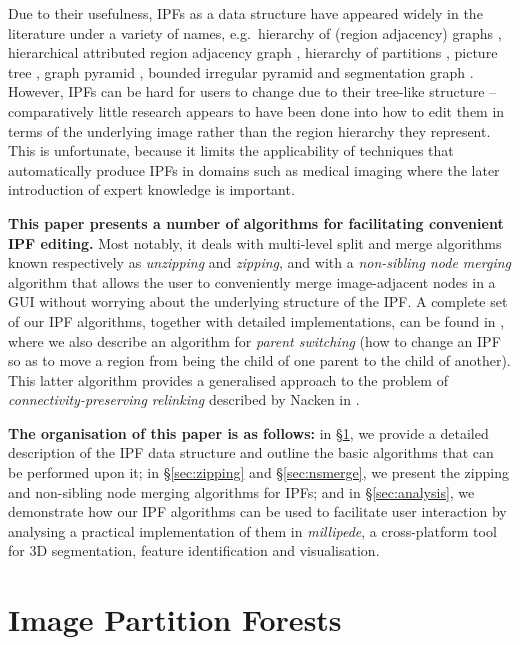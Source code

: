 \documentclass[10pt,twocolumn,twoside]{IEEEtran}
\begin{document}
\IEEEpubidadjcol

Due to their usefulness, IPFs as a data structure have appeared widely in the literature under a variety of names, e.g.~hierarchy of (region adjacency) graphs \cite{kropatsch04,nacken95,shen97}, hierarchical attributed region adjacency graph \cite{fischer04}, hierarchy of partitions \cite{haxhimusa03,lezoray06}, picture tree \cite{andrade03}, graph pyramid \cite{kerren06}, bounded irregular pyramid \cite{marfil07} and segmentation graph \cite{borenstein06}. However, IPFs can be hard for users to change due to their tree-like structure -- comparatively little research appears to have been done into how to edit them in terms of the underlying image rather than the region hierarchy they represent. This is unfortunate, because it limits the applicability of techniques that automatically produce IPFs in domains such as medical imaging where the later introduction of expert knowledge is important.

\textbf{This paper presents a number of algorithms for facilitating convenient IPF editing.} Most notably, it deals with multi-level split and merge algorithms known respectively as \emph{unzipping} and \emph{zipping}, and with a \emph{non-sibling node merging} algorithm that allows the user to conveniently merge image-adjacent nodes in a GUI without worrying about the underlying structure of the IPF. A complete set of our IPF algorithms, together with detailed implementations, can be found in \cite{golodetz11}, where we also describe an algorithm for \emph{parent switching} (how to change an IPF so as to move a region from being the child of one parent to the child of another). This latter algorithm provides a generalised approach to the problem of \emph{connectivity-preserving relinking} described by Nacken in \cite{nacken95}.

\textbf{The organisation of this paper is as follows:} in \S\ref{sec:ipfs}, we provide a detailed description of the IPF data structure and outline the basic algorithms that can be performed upon it; in \S\ref{sec:zipping} and \S\ref{sec:nsmerge}, we present the zipping and non-sibling node merging algorithms for IPFs; and in \S\ref{sec:analysis}, we demonstrate how our IPF algorithms can be used to facilitate user interaction by analysing a practical implementation of them in \emph{millipede}, a cross-platform tool for 3D segmentation, feature identification and visualisation.

\section{Image Partition Forests}
\label{sec:ipfs}
\end{document}
